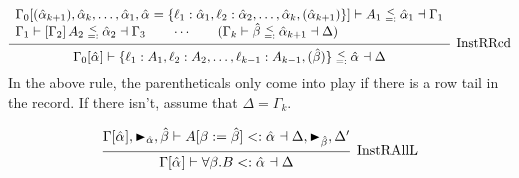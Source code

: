\documentclass{article}
\newcommand{\marker}[1]{\RHD_{#1}}
\newcommand{\subtype}{<:}
\newcommand{\instRSymbol}{\;\substack{<\\=:}\;}
\newcommand{\ev}{\hat}
\newcommand{\spc}{\qquad}
\newcommand{\apply}[1]{\left[#1\right]}
\newcommand{\eva}[1][]{\ev \alpha_{#1}}
\newcommand{\evb}{\ev \beta}
\newcommand{\subtypes}[4]{#1 \vdash #2 \subtype #3 \dashv #4}
\newcommand{\instR}[4]{#1 \vdash #2 \instRSymbol #3 \dashv #4}
\newcommand{\deduct}[3][]
{
  \begin{prooftree}
    \hypo{#2}
    \infer1[\text{#1}]{#3}
  \end{prooftree}
}
\begin{document}
\[
  \deduct[InstRRcd]
  {
    \begin{array}{l}
     \instR{\Gamma_0[(\eva[k+1]), \eva[k], \dots, \eva[1], \eva=\{\ell_1 : \eva[1],
      \ell_2 : \eva[2], \dots, \eva[k], (\eva[k+1])\}]}{A_1}{\eva[1]}{\Gamma_1} \\
    \instR{\Gamma_1}{\apply{\Gamma_2} A_2}{\eva[2]}{\Gamma_3} \spc \cdots \spc
     (\instR{\Gamma_k}{\evb}{\eva[k+1]}{\Delta})
  \end{array}
  }
  {\instR{\Gamma_0[\eva]}{\{\ell_1:A_1, \ell_2 : A_2, \dots, \ell_{k-1} : A_{k-1}, (\evb)\}}{\eva}{\Delta}}
\]
In the above rule, the parentheticals only come into play if there is a row tail
in the record. If there isn't, assume that \(\Delta = \Gamma_k\).

\[
  \deduct[InstRAllL]
  { \subtypes{\Gamma[\eva], \marker{\ev\alpha}, \evb}{A[\beta := \evb]}{\eva}{\Delta, \marker{\evb}, \Delta'} }
  { \subtypes{\Gamma[\eva]}{\forall \beta. B}{\eva}{\Delta} }
\]
\end{document}
